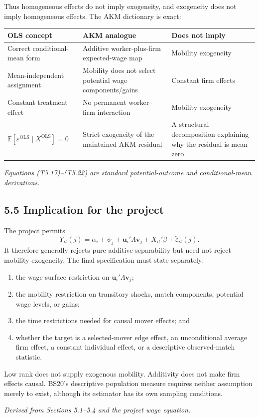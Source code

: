 \documentclass[11pt]{article}
\begin{document}
Thus homogeneous effects do not imply exogeneity, and exogeneity does not
imply homogeneous effects.  The AKM dictionary is exact:

\begin{longtable}{p{}p{}p{}}
\textbf{OLS concept} & \textbf{AKM analogue} & \textbf{Does not imply} \\
\hline
Correct conditional-mean form & Additive worker-plus-firm expected-wage map &
Mobility exogeneity \\
Mean-independent assignment & Mobility does not select potential wage
components/gains & Constant firm effects \\
Constant treatment effect & No permanent worker--firm interaction &
Mobility exogeneity \\
\(\mathbb E[\varepsilon^{\mathrm{OLS}}\mid X^{\mathrm{OLS}}]=0\) &
Strict exogeneity of the maintained AKM residual &
A structural decomposition explaining why the residual is mean zero \\
\end{longtable}

\textit{Equations (T5.17)--(T5.22) are standard potential-outcome and
conditional-mean derivations.}

\subsection{5.5 Implication for the project}

The project permits
\[
Y_{it}(j)
=
\alpha_i+\psi_j
+\mathbf u_i'\Lambda\mathbf v_j
+X_{it}'\beta
+\widetilde\varepsilon_{it}(j).
\tag{T5.23}
\]
It therefore generally rejects pure additive separability but need not reject
mobility exogeneity.  The final specification must state separately:

\begin{enumerate}
\item the wage-surface restriction on
  \(\mathbf u_i'\Lambda\mathbf v_j\);
\item the mobility restriction on transitory shocks, match components,
  potential wage levels, or gains;
\item the time restrictions needed for causal mover effects; and
\item whether the target is a selected-mover edge effect, an unconditional
  average firm effect, a constant individual effect, or a descriptive
  observed-match statistic.
\end{enumerate}

Low rank does not supply exogenous mobility.  Additivity does not make firm
effects causal.  BS20's descriptive population measure requires neither
assumption merely to exist, although its estimator has its own sampling
conditions.

\textit{Derived from Sections 5.1--5.4 and the project wage equation.}
\end{document}
